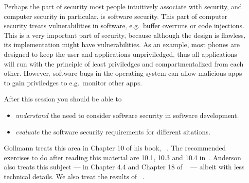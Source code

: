 Perhaps the part of security most people intuitively associate with security, 
and computer security in particular, is software security.
This part of computer security treats vulnerabilities in software, e.g.\ buffer 
overruns or code injections.
This is a very important part of security, because although the design is 
flawless, its implementation might have vulnerabilities.
As an example, most phones are designed to keep the user and applications 
unpriviledged, thus all applications will run with the principle of least 
priviledges and compartmentalized from each other.
However, software bugs in the operating system can allow malicious apps to gain
priviledges to e.g.\ monitor other apps.

After this session you should be able to
\begin{itemize}
  \item \emph{understand} the need to consider software security in software 
    development.
  \item \emph{evaluate} the software security requirements for different 
    sitations.
\end{itemize}

Gollmann treats this area in Chapter 10 of his book, 
~\cite{Gollmann2011cs}.
The recommended exercises to do after reading this material are 10.1, 10.3 and 
10.4 in~\cite{Gollmann2011cs}.
Anderson also treats this subject --- in Chapter 4.4 and Chapter 18 of 
~\cite{Anderson2008sea} --- albeit with less 
technical details.
We also treat the results of ~\cite{BSIMMFindings}.
